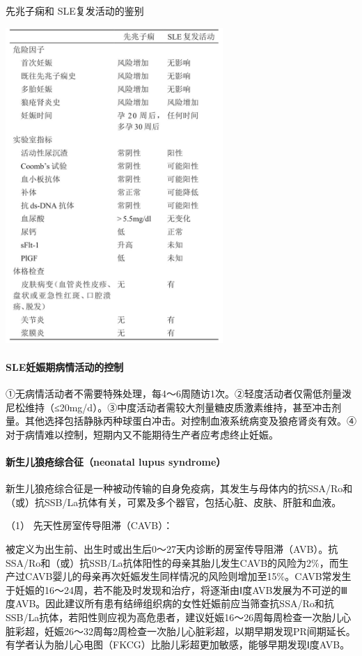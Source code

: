\begin{table}[htbp]
\centering
\caption{先兆子痫和 SLE复发活动的鉴别}
\label{tab125-2}
\includegraphics[width=3.25in,height=4.71875in]{./images/Image00499.jpg}
\end{table}


\paragraph{SLE妊娠期病情活动的控制}

①无病情活动者不需要特殊处理，每4～6周随访1次。②轻度活动者仅需低剂量泼尼松维持（≤20mg/d）。③中度活动者需较大剂量糖皮质激素维持，甚至冲击剂量。其他选择包括静脉丙种球蛋白冲击。对控制血液系统病变及狼疮肾炎有效。④对于病情难以控制，短期内又不能期待生产者应考虑终止妊娠。

\paragraph{新生儿狼疮综合征（neonatal lupus syndrome）}

新生儿狼疮综合征是一种被动传输的自身免疫病，其发生与母体内的抗SSA/Ro和（或）抗SSB/La抗体有关，可累及多个器官，包括心脏、皮肤、肝脏和血液。

\hypertarget{text00347.htmlux5cux23CHP14-1-3-9-4-4-1}{}
（1） 先天性房室传导阻滞（CAVB）：

被定义为出生前、出生时或出生后0～27天内诊断的房室传导阻滞（AVB）。抗SSA/Ro和（或）抗SSB/La抗体阳性的母亲其胎儿发生CAVB的风险为2\%，而生产过CAVB婴儿的母亲再次妊娠发生同样情况的风险则增加至15\%。CAVB常发生于妊娠的16～24周，若不能及时发现和治疗，将逐渐由Ⅰ度AVB发展为不可逆的Ⅲ度AVB。因此建议所有患有结缔组织病的女性妊娠前应当筛查抗SSA/Ro和抗SSB/La抗体，若阳性则应视为高危患者，建议妊娠16～26周每周检查一次胎儿心脏彩超，妊娠26～32周每2周检查一次胎儿心脏彩超，以期早期发现PR间期延长。有学者认为胎儿心电图（FKCG）比胎儿彩超更加敏感，能够早期发现Ⅰ度AVB。

